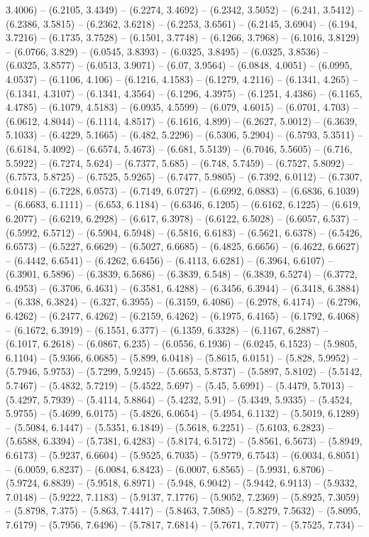 3.4006) -- (6.2105, 3.4349) -- (6.2274, 3.4692) -- (6.2342, 3.5052) -- (6.241, 3.5412) -- (6.2386, 3.5815) -- (6.2362, 3.6218) -- (6.2253, 3.6561) -- (6.2145, 3.6904) -- (6.194, 3.7216) -- (6.1735, 3.7528) -- (6.1501, 3.7748) -- (6.1266, 3.7968) -- (6.1016, 3.8129) -- (6.0766, 3.829) -- (6.0545, 3.8393) -- (6.0325, 3.8495) -- (6.0325, 3.8536) -- (6.0325, 3.8577) -- (6.0513, 3.9071) -- (6.07, 3.9564) -- (6.0848, 4.0051) -- (6.0995, 4.0537) -- (6.1106, 4.106) -- (6.1216, 4.1583) -- (6.1279, 4.2116) -- (6.1341, 4.265) -- (6.1341, 4.3107) -- (6.1341, 4.3564) -- (6.1296, 4.3975) -- (6.1251, 4.4386) -- (6.1165, 4.4785) -- (6.1079, 4.5183) -- (6.0935, 4.5599) -- (6.079, 4.6015) -- (6.0701, 4.703) -- (6.0612, 4.8044) -- (6.1114, 4.8517) -- (6.1616, 4.899) -- (6.2627, 5.0012) -- (6.3639, 5.1033) -- (6.4229, 5.1665) -- (6.482, 5.2296) -- (6.5306, 5.2904) -- (6.5793, 5.3511) -- (6.6184, 5.4092) -- (6.6574, 5.4673) -- (6.681, 5.5139) -- (6.7046, 5.5605) -- (6.716, 5.5922) -- (6.7274, 5.624) -- (6.7377, 5.685) -- (6.748, 5.7459) -- (6.7527, 5.8092) -- (6.7573, 5.8725) -- (6.7525, 5.9265) -- (6.7477, 5.9805) -- (6.7392, 6.0112) -- (6.7307, 6.0418) -- (6.7228, 6.0573) -- (6.7149, 6.0727) -- (6.6992, 6.0883) -- (6.6836, 6.1039) -- (6.6683, 6.1111) -- (6.653, 6.1184) -- (6.6346, 6.1205) -- (6.6162, 6.1225) -- (6.619, 6.2077) -- (6.6219, 6.2928) -- (6.617, 6.3978) -- (6.6122, 6.5028) -- (6.6057, 6.537) -- (6.5992, 6.5712) -- (6.5904, 6.5948) -- (6.5816, 6.6183) -- (6.5621, 6.6378) -- (6.5426, 6.6573) -- (6.5227, 6.6629) -- (6.5027, 6.6685) -- (6.4825, 6.6656) -- (6.4622, 6.6627) -- (6.4442, 6.6541) -- (6.4262, 6.6456) -- (6.4113, 6.6281) -- (6.3964, 6.6107) -- (6.3901, 6.5896) -- (6.3839, 6.5686) -- (6.3839, 6.548) -- (6.3839, 6.5274) -- (6.3772, 6.4953) -- (6.3706, 6.4631) -- (6.3581, 6.4288) -- (6.3456, 6.3944) -- (6.3418, 6.3884) -- (6.338, 6.3824) -- (6.327, 6.3955) -- (6.3159, 6.4086) -- (6.2978, 6.4174) -- (6.2796, 6.4262) -- (6.2477, 6.4262) -- (6.2159, 6.4262) -- (6.1975, 6.4165) -- (6.1792, 6.4068) -- (6.1672, 6.3919) -- (6.1551, 6.377) -- (6.1359, 6.3328) -- (6.1167, 6.2887) -- (6.1017, 6.2618) -- (6.0867, 6.235) -- (6.0556, 6.1936) -- (6.0245, 6.1523) -- (5.9805, 6.1104) -- (5.9366, 6.0685) -- (5.899, 6.0418) -- (5.8615, 6.0151) -- (5.828, 5.9952) -- (5.7946, 5.9753) -- (5.7299, 5.9245) -- (5.6653, 5.8737) -- (5.5897, 5.8102) -- (5.5142, 5.7467) -- (5.4832, 5.7219) -- (5.4522, 5.697) -- (5.45, 5.6991) -- (5.4479, 5.7013) -- (5.4297, 5.7939) -- (5.4114, 5.8864) -- (5.4232, 5.91) -- (5.4349, 5.9335) -- (5.4524, 5.9755) -- (5.4699, 6.0175) -- (5.4826, 6.0654) -- (5.4954, 6.1132) -- (5.5019, 6.1289) -- (5.5084, 6.1447) -- (5.5351, 6.1849) -- (5.5618, 6.2251) -- (5.6103, 6.2823) -- (5.6588, 6.3394) -- (5.7381, 6.4283) -- (5.8174, 6.5172) -- (5.8561, 6.5673) -- (5.8949, 6.6173) -- (5.9237, 6.6604) -- (5.9525, 6.7035) -- (5.9779, 6.7543) -- (6.0034, 6.8051) -- (6.0059, 6.8237) -- (6.0084, 6.8423) -- (6.0007, 6.8565) -- (5.9931, 6.8706) -- (5.9724, 6.8839) -- (5.9518, 6.8971) -- (5.948, 6.9042) -- (5.9442, 6.9113) -- (5.9332, 7.0148) -- (5.9222, 7.1183) -- (5.9137, 7.1776) -- (5.9052, 7.2369) -- (5.8925, 7.3059) -- (5.8798, 7.375) -- (5.863, 7.4417) -- (5.8463, 7.5085) -- (5.8279, 7.5632) -- (5.8095, 7.6179) -- (5.7956, 7.6496) -- (5.7817, 7.6814) -- (5.7671, 7.7077) -- (5.7525, 7.734) -- 